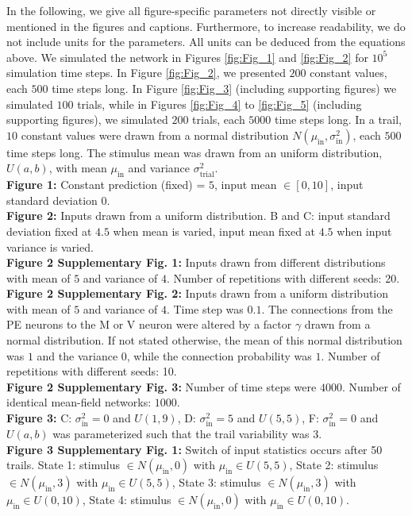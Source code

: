 \documentclass[10pt,a4paper]{article}
\begin{document}
In the following, we give all figure-specific parameters not directly visible or mentioned in the figures and captions. Furthermore, to increase readability, we do not include units for the parameters. All units can be deduced from the equations above. We simulated the network in Figures \ref{fig:Fig_1} and \ref{fig:Fig_2} for $10^5$ simulation time steps. In Figure \ref{fig:Fig_2}, we presented $200$ constant values, each $500$ time steps long. In Figure \ref{fig:Fig_3} (including supporting figures) we simulated $100$ trials, while in Figures \ref{fig:Fig_4} to \ref{fig:Fig_5} (including supporting figures), we simulated $200$ trials, each $5000$ time steps long. In a trail, $10$ constant values were drawn from a normal distribution $N(\mu_\mathrm{in}, \sigma^2_\mathrm{in})$, each $500$ time steps long. The stimulus mean was drawn from an uniform distribution, $U(a, b)$, with mean $\mu_\mathrm{in}$ and variance $\sigma^2_\mathrm{trial}$.\newline\\ 
%
\textbf{Figure 1:} Constant prediction (fixed) = $5$, input mean $\in [0,10]$, input standard deviation $0$.\\
%
\textbf{Figure 2:} Inputs drawn from a uniform distribution. B and C: input standard deviation fixed at $4.5$ when mean is varied, input mean fixed at $4.5$ when input variance is varied.\\
%
\textbf{Figure 2 Supplementary Fig. 1:} Inputs drawn from different distributions with mean of $5$ and variance of $4$. Number of repetitions with different seeds: 20.\\
%
\textbf{Figure 2 Supplementary Fig. 2:} Inputs drawn from a uniform distribution with mean of $5$ and variance of $4$. Time step was $0.1$. The connections from the PE neurons to the M or V neuron were altered by a factor $\gamma$ drawn from a normal distribution. If not stated otherwise, the mean of this normal distribution was $1$ and the variance $0$, while the connection probability was $1$. Number of repetitions with different seeds: 10.\\
%
\textbf{Figure 2 Supplementary Fig. 3:} Number of time steps were $4000$. Number of identical mean-field networks: $1000$. \\
%
\textbf{Figure 3:} C: $\sigma^2_\mathrm{in} = 0$ and $U(1,9)$, D:  $\sigma^2_\mathrm{in} = 5$ and $U(5,5)$, F: $\sigma^2_\mathrm{in} = 0$ and $U(a,b)$ was parameterized such that the trail variability was $3$.\\
%
\textbf{Figure 3 Supplementary Fig. 1:}  Switch of input statistics occurs after 50 trails. State 1: stimulus $\in N(\mu_\mathrm{in}, 0)$ with $\mu_\mathrm{in} \in U(5,5)$, State 2:  stimulus $\in N(\mu_\mathrm{in}, 3)$ with $\mu_\mathrm{in} \in U(5,5)$, State 3: stimulus $\in N(\mu_\mathrm{in}, 3)$ with $\mu_\mathrm{in} \in U(0,10)$, State 4: stimulus $\in N(\mu_\mathrm{in}, 0)$ with $\mu_\mathrm{in} \in U(0,10)$.\\
\end{document}
